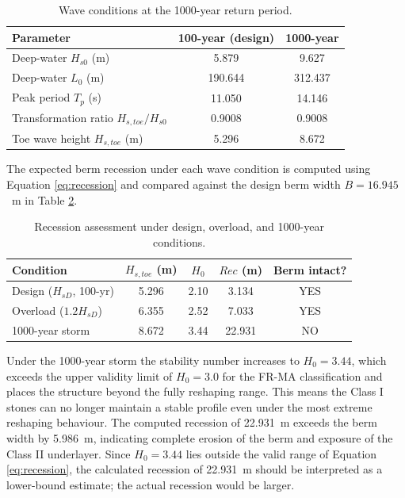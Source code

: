 \documentclass[a4paper, 11pt]{article}
\begin{document}
\begin{table}[h!]
\centering
\caption{Wave conditions at the 1000-year return period.}
\label{tab:1000yr_waves}
\begin{tabular}{lcc}
\hline
Parameter & 100-year (design) & 1000-year \\
\hline
Deep-water $H_{s0}$ (m) & 5.879 & 9.627 \\
Deep-water $L_0$ (m) & 190.644 & 312.437 \\
Peak period $T_p$ (s) & 11.050 & 14.146 \\
Transformation ratio $H_{s,toe}/H_{s0}$ & 0.9008 & 0.9008 \\
Toe wave height $H_{s,toe}$ (m) & 5.296 & 8.672 \\
\hline
\end{tabular}
\end{table}

The expected berm recession under each wave condition is computed using Equation \ref{eq:recession} and compared against the design berm width $B = 16.945$~m in Table \ref{tab:recession_summary}.

\begin{table}[h!]
\centering
\caption{Recession assessment under design, overload, and 1000-year conditions.}
\label{tab:recession_summary}
\begin{tabular}{lcccc}
\hline
Condition & $H_{s,toe}$ (m) & $H_0$ & $Rec$ (m) & Berm intact? \\
\hline
Design ($H_{sD}$, 100-yr) & 5.296 & 2.10 & 3.134 & YES \\
Overload ($1.2 H_{sD}$) & 6.355 & 2.52 & 7.033 & YES \\
1000-year storm & 8.672 & 3.44 & 22.931 & NO \\
\hline
\end{tabular}
\end{table}

Under the 1000-year storm the stability number increases to $H_0 = 3.44$, which exceeds the upper validity limit of $H_0 = 3.0$ for the FR-MA classification and places the structure beyond the fully reshaping range. This means the Class I stones can no longer maintain a stable profile even under the most extreme reshaping behaviour. The computed recession of 22.931~m exceeds the berm width by 5.986~m, indicating complete erosion of the berm and exposure of the Class II underlayer. Since $H_0 = 3.44$ lies outside the valid range of Equation \ref{eq:recession}, the calculated recession of 22.931~m should be interpreted as a lower-bound estimate; the actual recession would be larger.
\end{document}
